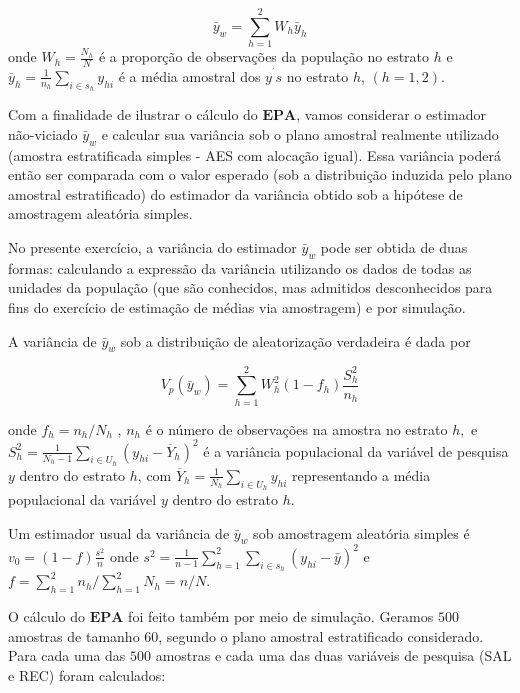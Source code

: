 \documentclass[]{book}
\numberwithin{example}{chapter}
\numberwithin{remark}{chapter}
\numberwithin{definition}{chapter}
\begin{document}
\[
\bar{y}_{w}=\sum\limits_{h=1}^{2}W_{h}\bar{y}_{h} 
\] onde \(W_{h}=\frac{N_{h}}{N}\) é a proporção de observações da
população no estrato \(h\) e
\(\bar{y}_{h}=\frac{1}{n_{h}}\sum\limits_{i\in s_{h}}y_{hi}\) é a média
amostral dos \(y^{^{\prime}}s\) no estrato \(h\), \((h=1,2)\).

Com a finalidade de ilustrar o cálculo do \(\mathbf{EPA}\), vamos
considerar o estimador não-viciado \(\bar{y}_{w}\) e calcular sua
variância sob o plano amostral realmente utilizado (amostra
estratificada simples - AES com alocação igual). Essa variância poderá
então ser comparada com o valor esperado (sob a distribuição induzida
pelo plano amostral estratificado) do estimador da variância obtido sob
a hipótese de amostragem aleatória simples.

No presente exercício, a variância do estimador \(\bar{y}_{w}\) pode ser
obtida de duas formas: calculando a expressão da variância utilizando os
dados de todas as unidades da população (que são conhecidos, mas
admitidos desconhecidos para fins do exercício de estimação de médias
via amostragem) e por simulação.

A variância de \(\bar{y}_{w}\) sob a distribuição de aleatorização
verdadeira é dada por

\begin{equation}
V_{p}\left( \bar{y}_{w}\right) =\sum\limits_{h=1}^{2}W_{h}^{2}\left(
1-f_{h}\right) \frac{S_{h}^{2}}{n_{h}}  \label{eq:epa3}
\end{equation}

onde \(f_{h}=n_{h}/N_{h}\) , \(n_{h}\) é o número de observações na
amostra no estrato \(h,\) e
\(S_{h}^{2}=\frac{1}{N_{h}-1}\sum\limits_{i\in U_{h}}\left( y_{hi}-\overline{Y}_{h}\right) ^{2}\)
é a variância populacional da variável de pesquisa \(y\) dentro do
estrato \(h\), com
\(\overline{Y}_{h}=\frac{1}{N_{h}}\sum\limits_{i\in U_{h}}y_{hi}\)
representando a média populacional da variável \(y\) dentro do estrato
\(h\).

Um estimador usual da variância de \(\bar{y}_{w}\) sob amostragem
aleatória simples é \(v_{0}=\left( 1-f\right) \frac{s^{2}}{n}\) onde
\(s^{2}=\frac{1}{n-1}\sum\limits_{h=1}^{2}\sum\limits_{i\in s_{h}}\left(y_{hi}-\bar{y}\right) ^{2}\)
e \(f=\sum_{h=1}^{2}n_{h}/\sum_{h=1}^{2}N_{h} =n/N\).

O cálculo do \(\mathbf{EPA}\) foi feito também por meio de simulação.
Geramos \(500\) amostras de tamanho \(60\), segundo o plano amostral
estratificado considerado. Para cada uma das \(500\) amostras e cada uma
das duas variáveis de pesquisa (SAL e REC) foram calculados:
\end{document}
